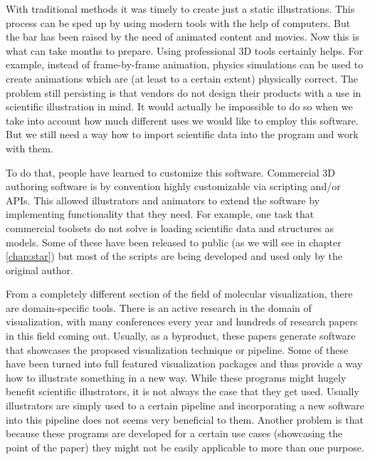 \documentclass[
  digital, %
  table,   %
  nolof,     %
  nolot,     %
]{fithesis3}
\begin{document}
With traditional methods it was timely to create just a static illustrations. This process can be sped up by using modern tools with the help of computers. But the bar has been raised by the need of animated content and movies. Now this is what can take months to prepare. Using professional 3D tools certainly helps. For example, instead of frame-by-frame animation, physics simulations can be used to create animations which are (at least to a certain extent) physically correct. The problem still persisting is that vendors do not design their products with a use in scientific illustration in mind. It would actually be impossible to do so when we take into account how much different uses we would like to employ this software. But we still need a way how to import scientific data into the program and work with them.

To do that, people have learned to customize this software\cite{GrahamGaelInterview}. Commercial 3D authoring software is by convention highly customizable via scripting and/or APIs. This allowed illustrators and animators to extend the software by implementing functionality that they need. For example, one task that commercial toolsets do not solve is loading scientific data and structures as models. Some of these have been released to public (as we will see in chapter \ref{chap:star}) but most of the scripts are being developed and used only by the original author.

From a completely different section of the field of molecular visualization, there are domain-specific tools. There is an active research in the domain of visualization, with many conferences every year and hundreds of research papers in this field coming out. Usually, as a byproduct, these papers generate software that showcases the proposed visualization technique or pipeline. Some of these have been turned into full featured visualization packages and thus provide a way how to illustrate something in a new way. While these programs might hugely benefit scientific illustrators, it is not always the case that they get used. Usually illustrators are simply used to a certain pipeline and incorporating a new software into this pipeline does not seems very beneficial to them. Another problem is that because these programs are developed for a certain use cases (showcasing the point of the paper) they might not be easily applicable to more than one purpose.
\end{document}
